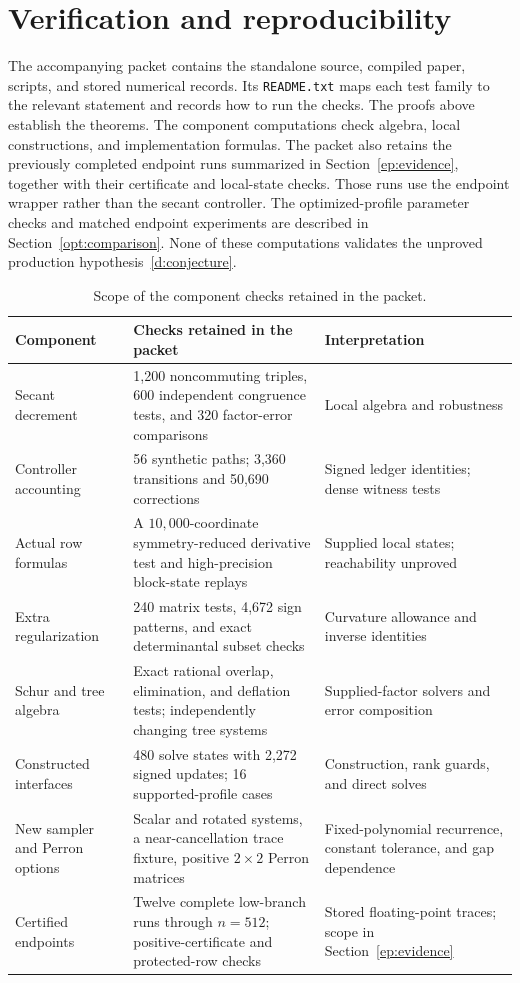 \documentclass[11pt]{amsart}
\theoremstyle{definition}\newtheorem{definition}[theorem]{Definition}
\theoremstyle{remark}\newtheorem{remark}[theorem]{Remark}
\numberwithin{equation}{section}
\begin{document}
\section{Verification and reproducibility}\label{v:numerics}
\suppressfloats[t]
The accompanying packet contains the standalone source, compiled paper,
scripts, and stored numerical records. Its \texttt{README.txt} maps each
test family to the relevant statement and records how to run the checks.
The proofs above establish the theorems. The component computations check algebra,
local constructions, and implementation formulas. The packet also retains
the previously completed endpoint runs summarized in
Section~\ref{ep:evidence}, together with their certificate and local-state
checks. Those runs use the endpoint wrapper rather than the secant
controller. The optimized-profile parameter checks and matched endpoint experiments
are described in Section~\ref{opt:comparison}. None of these computations
validates the unproved production
hypothesis~\eqref{d:conjecture}.

\begin{table}[t]
\centering\small
\caption{Scope of the component checks retained in the packet.}
\label{new:verification-table}
\begin{tabular}{@{}L{0.25\textwidth}L{0.43\textwidth}L{0.24\textwidth}@{}}
\toprule
Component & Checks retained in the packet & Interpretation\\
\midrule
Secant decrement & 1,200 noncommuting triples, 600 independent congruence
tests, and 320 factor-error comparisons & Local algebra and robustness\\[3pt]
Controller accounting & 56 synthetic paths; 3,360 transitions and
50,690 corrections & Signed ledger identities; dense witness tests\\[3pt]
Actual row formulas & A $10,000$-coordinate symmetry-reduced derivative
test and high-precision block-state replays & Supplied local states;
reachability unproved\\[3pt]
Extra regularization & 240 matrix tests, 4,672 sign patterns, and exact
determinantal subset checks & Curvature allowance and inverse identities\\[3pt]
Schur and tree algebra & Exact rational overlap, elimination, and
deflation tests; independently changing tree systems & Supplied-factor
solvers and error composition\\[3pt]
Constructed interfaces & 480 solve states with 2,272 signed updates;
16 supported-profile cases & Construction, rank guards, and direct solves\\[3pt]
New sampler and Perron options & Scalar and rotated systems, a
near-cancellation trace fixture, positive $2\times2$ Perron matrices &
Fixed-polynomial recurrence, constant tolerance, and gap dependence\\[3pt]
Certified endpoints & Twelve complete low-branch runs through $n=512$;
positive-certificate and protected-row checks & Stored floating-point
traces; scope in Section~\ref{ep:evidence}\\
\bottomrule
\end{tabular}
\end{table}
\end{document}
